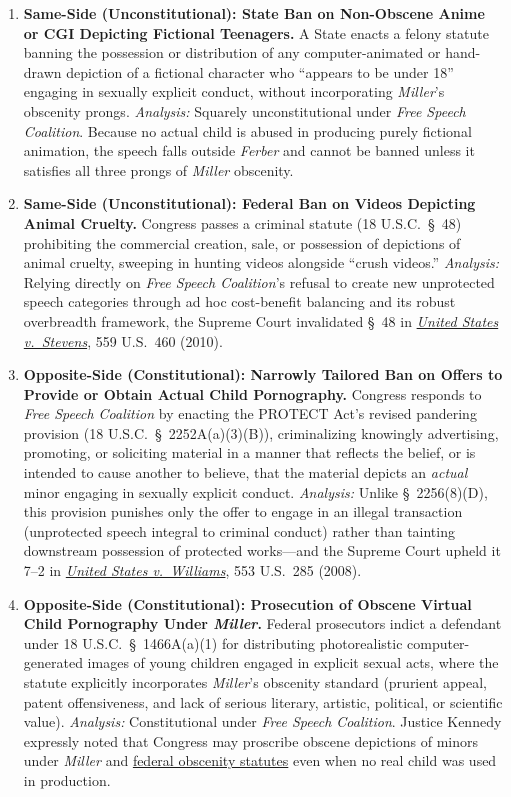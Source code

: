 \documentclass[12pt]{article}
\begin{document}
\begin{enumerate}
\item \textbf{Same-Side (Unconstitutional): State Ban on Non-Obscene Anime or CGI Depicting Fictional Teenagers.} A State enacts a felony statute banning the possession or distribution of any computer-animated or hand-drawn depiction of a fictional character who ``appears to be under 18'' engaging in sexually explicit conduct, without incorporating \textit{Miller}'s obscenity prongs. \textit{Analysis:} Squarely unconstitutional under \textit{Free Speech Coalition}. Because no actual child is abused in producing purely fictional animation, the speech falls outside \textit{Ferber} and cannot be banned unless it satisfies all three prongs of \textit{Miller} obscenity.
\item \textbf{Same-Side (Unconstitutional): Federal Ban on Videos Depicting Animal Cruelty.} Congress passes a criminal statute (18 U.S.C.\ \S~48) prohibiting the commercial creation, sale, or possession of depictions of animal cruelty, sweeping in hunting videos alongside ``crush videos.'' \textit{Analysis:} Relying directly on \textit{Free Speech Coalition}'s refusal to create new unprotected speech categories through ad hoc cost-benefit balancing and its robust overbreadth framework, the Supreme Court invalidated \S~48 in \href{https://supreme.justia.com/cases/federal/us/559/460/}{\textit{United States v.\ Stevens}}, 559 U.S.\ 460 (2010).
\item \textbf{Opposite-Side (Constitutional): Narrowly Tailored Ban on Offers to Provide or Obtain Actual Child Pornography.} Congress responds to \textit{Free Speech Coalition} by enacting the PROTECT Act's revised pandering provision (18 U.S.C.\ \S~2252A(a)(3)(B)), criminalizing knowingly advertising, promoting, or soliciting material in a manner that reflects the belief, or is intended to cause another to believe, that the material depicts an \textit{actual} minor engaging in sexually explicit conduct. \textit{Analysis:} Unlike \S~2256(8)(D), this provision punishes only the offer to engage in an illegal transaction (unprotected speech integral to criminal conduct) rather than tainting downstream possession of protected works---and the Supreme Court upheld it 7--2 in \href{https://supreme.justia.com/cases/federal/us/553/285/}{\textit{United States v.\ Williams}}, 553 U.S.\ 285 (2008).
\item \textbf{Opposite-Side (Constitutional): Prosecution of Obscene Virtual Child Pornography Under \textit{Miller}.} Federal prosecutors indict a defendant under 18 U.S.C.\ \S~1466A(a)(1) for distributing photorealistic computer-generated images of young children engaged in explicit sexual acts, where the statute explicitly incorporates \textit{Miller}'s obscenity standard (prurient appeal, patent offensiveness, and lack of serious literary, artistic, political, or scientific value). \textit{Analysis:} Constitutional under \textit{Free Speech Coalition}. Justice Kennedy expressly noted that Congress may proscribe obscene depictions of minors under \textit{Miller} and \href{https://www.law.cornell.edu/constitution-conan/amendment-1/child-pornography}{federal obscenity statutes} even when no real child was used in production.

\end{enumerate}
\end{document}

